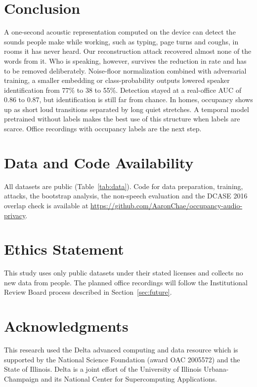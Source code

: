 \documentclass[11pt]{article}
\begin{document}
\section{Conclusion}
A one-second acoustic representation computed on the device can detect the sounds people make while working, such as typing, page turns and coughs, in rooms it has never heard. Our reconstruction attack recovered almost none of the words from it. Who is speaking, however, survives the reduction in rate and has to be removed deliberately. Noise-floor normalization combined with adversarial training, a smaller embedding or class-probability outputs lowered speaker identification from 77\% to 38 to 55\%. Detection stayed at a real-office AUC of 0.86 to 0.87, but identification is still far from chance. In homes, occupancy shows up as short loud transitions separated by long quiet stretches. A temporal model pretrained without labels makes the best use of this structure when labels are scarce. Office recordings with occupancy labels are the next step.

\section*{Data and Code Availability}
All datasets are public (Table~\ref{tab:data}). Code for data preparation, training, attacks, the bootstrap analysis, the non-speech evaluation and the DCASE 2016 overlap check is available at \url{https://github.com/AaronChae/occupancy-audio-privacy}.

\section*{Ethics Statement}
This study uses only public datasets under their stated licenses and collects no new data from people. The planned office recordings will follow the Institutional Review Board process described in Section~\ref{sec:future}.

\section*{Acknowledgments}
This research used the Delta advanced computing and data resource which is supported by the National Science Foundation (award OAC 2005572) and the State of Illinois. Delta is a joint effort of the University of Illinois Urbana-Champaign and its National Center for Supercomputing Applications.



\end{document}
